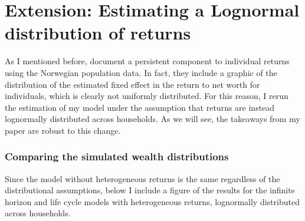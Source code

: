 \onlyinsubfile{\setcounter{section}{6}}
\section{Extension: Estimating a Lognormal distribution of returns}
\notinsubfile{\label{sec:lognorm}}

\par As I mentioned before, \cite{aflgdmlp20} document a persistent component to individual returns using the Norwegian population data. In fact, they include a graphic of the distribution of the estimated fixed effect in the return to net worth for individuals, which is clearly not uniformly distributed. For this reason, I rerun the estimation of my model under the assumption that returns are instead lognormally distributed across households. As we will see, the takeaways from my paper are robust to this change.

\subsubsection{Comparing the simulated wealth distributions}

\par Since the model without heterogeneous returns is the same regardless of the distributional assumptions, below I include a figure of the results for the infinite horizon and life cycle models with heterogeneous returns, lognormally distributed across households. 

